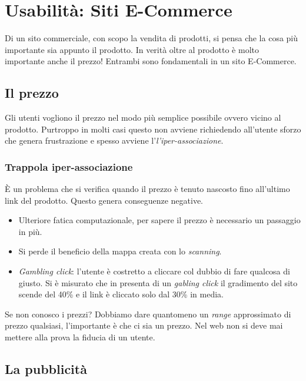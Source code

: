 
\chapter{Usabilità: Siti E-Commerce}
	Di un sito commerciale, con scopo la vendita di prodotti, si pensa che la cosa più importante sia appunto il prodotto. In verità oltre al prodotto è molto importante anche il prezzo! Entrambi sono fondamentali in un sito E-Commerce.

	\section{Il prezzo}
		Gli utenti vogliono il prezzo nel modo più semplice possibile ovvero vicino al prodotto. Purtroppo in molti casi questo non avviene richiedendo all'utente sforzo che genera frustrazione e spesso avviene l'\emph{l'iper-associazione}.
	
		\subsection{Trappola iper-associazione}
			È un problema che si verifica quando il prezzo è tenuto nascosto fino all'ultimo link del prodotto. Questo genera conseguenze negative.
			\begin{itemize}
				\item Ulteriore fatica computazionale, per sapere il prezzo è necessario un passaggio in più.
				\item Si perde il beneficio della mappa creata con lo \emph{scanning}.
				\item \emph{Gambling click}: l'utente è costretto a cliccare col dubbio di fare qualcosa di giusto. Si è misurato che in presenta di un \emph{gabling click} il gradimento del sito scende del 40\% e il link è cliccato solo dal 30\% in media.
			\end{itemize}
			Se non conosco i prezzi? Dobbiamo dare quantomeno un \emph{range} approssimato di prezzo qualsiasi, l'importante è che ci sia un prezzo. Nel web non si deve mai mettere alla prova la fiducia di un utente.
	
	\section{La pubblicità}
		
